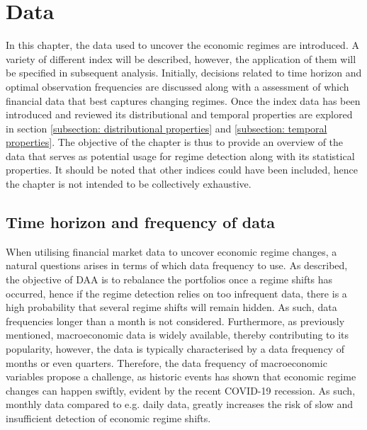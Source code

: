 \section{Data}
\label{section: Data}
In this chapter, the data used to uncover the economic regimes are introduced. A variety of different index will be described, however, the application of them will be specified in subsequent analysis. Initially, decisions related to time horizon and optimal observation frequencies are discussed along with a assessment of which financial data that best captures changing regimes. Once the index data has been introduced and reviewed its distributional and temporal properties are explored in section \ref{subsection: distributional properties} and \ref{subsection: temporal properties}. The objective of the chapter is thus to provide an overview of the data that serves as potential usage for regime detection along with its statistical properties. It should be noted that other indices could have been included, hence the chapter is not intended to be collectively exhaustive. 

\subsection{Time horizon and frequency of data}
\label{subsection: Data frequency}
When utilising financial market data to uncover economic regime changes, a natural questions arises in terms of which data frequency to use. As described, the objective of DAA is to rebalance the portfolios once a regime shifts has occurred, hence if the regime detection relies on too infrequent data, there is a high probability that several regime shifts will remain hidden. As such, data frequencies longer than a month is not considered. Furthermore, as previously mentioned, macroeconomic data is widely available, thereby contributing to its popularity, however, the data is typically characterised by a data frequency of months or even quarters. Therefore, the data frequency of macroeconomic variables propose a challenge, as historic events has shown that economic regime changes can happen swiftly, evident by the recent COVID-19 recession. As such, monthly data compared to e.g. daily data, greatly increases the risk of slow and insufficient detection of economic regime shifts.
 
